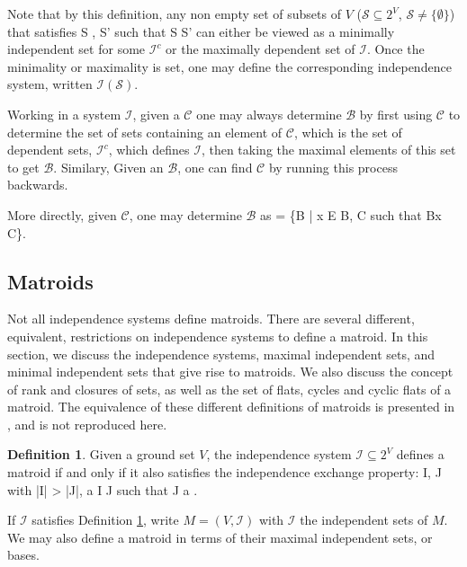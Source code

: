 \documentclass[11pt]{article}
\def\ba #1\ea{\begin{align} #1 \end{align}}
\def\bas #1\eas{\begin{align*} #1 \end{align*}}
\newcommand{\sI}{\mathscr{I}}
\newcommand{\cI}{\mathcal{I}}
\newcommand{\sC}{\mathscr{C}}
\newcommand{\sB}{\mathscr{B}}
\newcommand{\sS}{\mathscr{S}}
\theoremstyle{remark}
\theoremstyle{definition}
\newtheorem{dfn}[thm]{Definition}
\begin{document}
Note that by this definition, any non empty set of subsets of $V$ ($\sS \subseteq 2^V$, $\sS \neq \{\emptyset\}$) that satisfies \ba \forall S \in \sS, \; \not \exists S' \in \sS \textrm{ such that } S \subseteq S' \label{eqn:minmaxset}\ea can either be viewed as a minimally independent set for some $\sI^c$ or the maximally dependent set of $\sI$. Once the minimality or maximality is set, one may define the corresponding independence system, written $\sI(\sS)$.

Working in a system $\sI$, given a $\sC$ one may always determine $\sB$ by first using $\sC$ to determine the set of sets containing an element of $\sC$, which is the set of dependent sets, $\sI^c$, which defines $\sI$, then taking the maximal elements of this set to get $\sB$. Similary, Given an $\sB$, one can find $\sC$ by running this process backwards.

More directly, given $\sC$, one may determine $\sB$ as \bas \sB = \{B \in \cI| \forall x \in E \setminus B, \exists C \in \sC \textrm{ such that } B\cup x \supseteq C\}\;. \eas


\subsection{Matroids}

Not all independence systems define matroids. There are several different, equivalent, restrictions on independence systems to define a matroid. In this section, we discuss the independence systems, maximal independent sets, and minimal independent sets that give rise to matroids. We also discuss the concept of rank and closures of sets, as well as the set of flats, cycles and cyclic flats of a matroid. The equivalence of these different definitions of matroids is presented in \cite{OxleyMatroidBook}, and is not reproduced here.

\begin{dfn} \label{dfn:matroidindependence}Given a ground set $V$, the independence system $\sI \subseteq 2^V$ defines a matroid if and only if it also satisfies the independence exchange property: \ba \forall I,\; J \in \sI \textrm{ with } |I| > |J|, \; \exists a \in I \setminus J \textrm{ such that } J \cup a \in \sI \;.\label{eq:indepexchange} \ea 
\end{dfn}

If $\sI$ satisfies Definition \ref{dfn:matroidindependence}, write $M = (V, \sI)$ with $\sI$ the independent sets of $M$. We may also define a matroid in terms of their maximal independent sets, or bases. 
\end{document}
